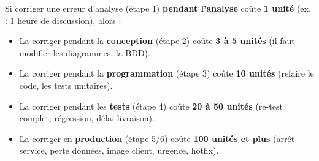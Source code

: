 \documentclass[11pt]{article}
\begin{document}
\begin{propriete}
Si corriger une erreur d'analyse (étape 1) \textbf{pendant l'analyse} coûte \textbf{1 unité} (ex. : 1 heure de discussion), alors :
\begin{itemize}
    \item La corriger pendant la \textbf{conception} (étape 2) coûte \textbf{3 à 5 unités} (il faut modifier les diagrammes, la BDD).
    \item La corriger pendant la \textbf{programmation} (étape 3) coûte \textbf{10 unités} (refaire le code, les tests unitaires).
    \item La corriger pendant les \textbf{tests} (étape 4) coûte \textbf{20 à 50 unités} (re-test complet, régression, délai livraison).
    \item La corriger en \textbf{production} (étape 5/6) coûte \textbf{100 unités et plus} (arrêt service, perte données, image client, urgence, hotfix).
\end{itemize}
\end{propriete}
\end{document}
